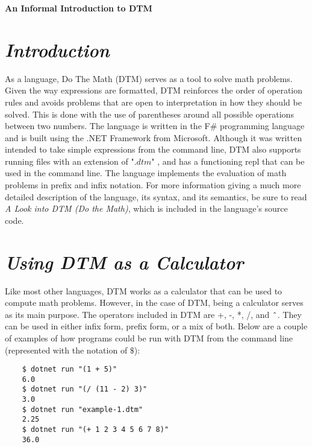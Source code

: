 \documentclass[10pt]{article}
\begin{document}
\newcommand{\YOURID}{Josiel Aponte}	
\newcommand{\MyLang}{DTM}	
\newcommand{\ProblemHeader}

\vspace{\baselineskip}

\begin{center}
    \Large\textbf{An Informal Introduction to DTM}\\
\end{center}

\section{\textit{Introduction}}

As a language, Do The Math (DTM) serves as a tool to solve math problems. Given the way expressions are formatted, DTM reinforces the order of operation rules and avoids problems that are open to interpretation in how they should be solved. This is done with the use of parentheses around all possible operations between two numbers. The language is written in the F\# programming language and is built using the .NET Framework from Microsoft. Although it was written intended to take simple expressions from the command line, DTM also supports running files with an extension of "$.dtm$" , and has a functioning repl that can be used in the command line. The language implements the evaluation of math problems in prefix and infix notation. For more information giving a much more detailed description of the language, its syntax, and its semantics, be sure to read \textit{A Look into DTM (Do the Math)}, which is included in the language’s source code.

\section{\textit{Using DTM as a Calculator}}

Like most other languages, DTM works as a calculator that can be used to compute math problems. However, in the case of DTM, being a calculator serves as its main purpose.  The operators included in DTM are +, -, *, /, and $\texttt{\^{}}$. They can be used in either infix form, prefix form, or a mix of both. Below are a couple of examples of how programs could be run with DTM from the command line (represented with the notation of $\texttt{\$}$):

\begin{verbatim}
    $ dotnet run "(1 + 5)"
    6.0
    $ dotnet run "(/ (11 - 2) 3)"
    3.0
    $ dotnet run "example-1.dtm"
    2.25
    $ dotnet run "(+ 1 2 3 4 5 6 7 8)"
    36.0
\end{verbatim}
\end{document}

